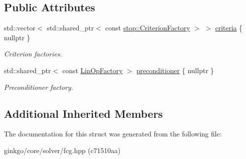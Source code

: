 \subsection*{Public Attributes}
\begin{DoxyCompactItemize}
\item 
\mbox{\label{structgko_1_1solver_1_1Fcg_1_1parameters__type_a4d322d51e9c1908b97a868746c191683}} 
std\+::vector$<$ std\+::shared\+\_\+ptr$<$ const \hyperlink{group__stop_gab12a51109c50b35ec36dc5a393d6a9a0}{stop\+::\+Criterion\+Factory} $>$ $>$ \hyperlink{structgko_1_1solver_1_1Fcg_1_1parameters__type_a4d322d51e9c1908b97a868746c191683}{criteria} \{ nullptr \}
\begin{DoxyCompactList}\small\item\em Criterion factories. \end{DoxyCompactList}\item 
\mbox{\label{structgko_1_1solver_1_1Fcg_1_1parameters__type_afbdb7787925ef4294b12fe6851cfafd4}} 
std\+::shared\+\_\+ptr$<$ const \hyperlink{classgko_1_1LinOpFactory}{Lin\+Op\+Factory} $>$ \hyperlink{structgko_1_1solver_1_1Fcg_1_1parameters__type_afbdb7787925ef4294b12fe6851cfafd4}{preconditioner} \{ nullptr \}
\begin{DoxyCompactList}\small\item\em Preconditioner factory. \end{DoxyCompactList}\end{DoxyCompactItemize}
\subsection*{Additional Inherited Members}


The documentation for this struct was generated from the following file\+:\begin{DoxyCompactItemize}
\item 
ginkgo/core/solver/fcg.\+hpp (c71510aa)\end{DoxyCompactItemize}
